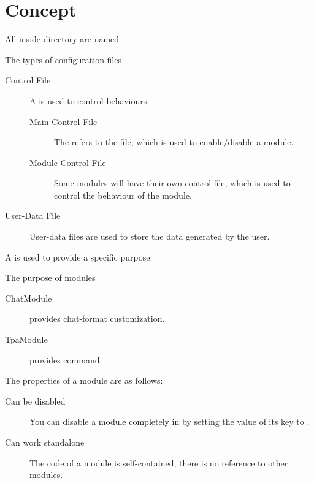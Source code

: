 \chapter{Concept}\label{ch:concept}

All  inside  directory are named 

\begin{note}{The types of configuration files}
    \begin{description}
        \item[Control File] {A  is used to control behaviours.}
        \begin{description}
            \item[Main-Control File] The  refers to the  file, which is used to enable/disable a module.
            \item[Module-Control File] Some modules will have their own control file, which is used to control the behaviour of the module.
        \end{description}

        \item[User-Data File] User-data files are used to store the data generated by the user.
    \end{description}
\end{note}


\clearpage
{}

A  is used to provide a specific purpose.
\begin{example}{The purpose of modules}
    \begin{description}
        \item [ChatModule] provides chat-format customization.
        \item [TpaModule] provides  command.
    \end{description}
\end{example}

The properties of a module are as follows:
\begin{description}
    \item [Can be disabled] You can disable a module completely in  by setting the value of its  key to .
    \item [Can work standalone] The code of a module is self-contained, there is no reference to other modules.
\end{description}

